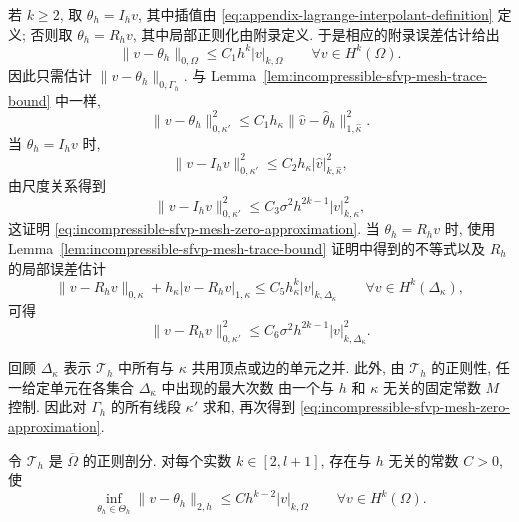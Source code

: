 \begin{Proof}
若 $k\geq2$, 取
$\theta_h=I_hv$, 其中插值由
\eqref{eq:appendix-lagrange-interpolant-definition} 定义;
否则取 $\theta_h=R_hv$, 其中局部正则化由附录定义.
于是相应的附录误差估计给出
\[
\|v-\theta_h\|_{0,\Omega}
\leq C_1h^k|v|_{k,\Omega}
\qquad\forall v\in H^k(\Omega).
\]
因此只需估计 $\|v-\theta_h\|_{0,\Gamma_h}$.
与 Lemma~\ref{lem:incompressible-sfvp-mesh-trace-bound} 中一样,
\[
\|v-\theta_h\|_{0,\kappa'}^2
\leq C_1h_\kappa
\|\widehat v-\widehat\theta_h\|_{1,\widehat\kappa}^2.
\]
当 $\theta_h=I_hv$ 时,
\[
\|v-I_hv\|_{0,\kappa'}^2
\leq C_2h_\kappa|\widehat v|_{k,\widehat\kappa}^2,
\]
由尺度关系得到
\[
\|v-I_hv\|_{0,\kappa'}^2
\leq C_3\sigma^2h^{2k-1}|v|_{k,\kappa}^2,
\]
这证明 \eqref{eq:incompressible-sfvp-mesh-zero-approximation}.
当 $\theta_h=R_hv$ 时, 使用
Lemma~\ref{lem:incompressible-sfvp-mesh-trace-bound}
证明中得到的不等式以及 $R_h$ 的局部误差估计
\begin{equation}\label{eq:incompressible-sfvp-local-regularization}
\|v-R_hv\|_{0,\kappa}
+h_\kappa|v-R_hv|_{1,\kappa}
\leq C_5h_\kappa^k|v|_{k,\Delta_\kappa}
\qquad\forall v\in H^k(\Delta_\kappa),
\end{equation}
可得
\[
\|v-R_hv\|_{0,\kappa'}^2
\leq C_6\sigma^2h^{2k-1}|v|_{k,\Delta_\kappa}^2.
\]

回顾 $\Delta_\kappa$ 表示 $\mathcal T_h$ 中所有与 $\kappa$
共用顶点或边的单元之并. 此外, 由 $\mathcal T_h$ 的正则性,
任一给定单元在各集合 $\Delta_\kappa$ 中出现的最大次数
由一个与 $h$ 和 $\kappa$ 无关的固定常数 $M$ 控制.
因此对 $\Gamma_h$ 的所有线段 $\kappa'$ 求和,
再次得到 \eqref{eq:incompressible-sfvp-mesh-zero-approximation}.
\end{Proof}

\begin{Lemma}\label{lem:incompressible-sfvp-mesh-two-approximation}
令 $\mathcal T_h$ 是 $\overline\Omega$ 的正则剖分.
对每个实数 $k\in[2,l+1]$, 存在与 $h$ 无关的常数 $C>0$, 使
\begin{equation}\label{eq:incompressible-sfvp-mesh-two-approximation}
\inf_{\theta_h\in\Theta_h}
\|v-\theta_h\|_{2,h}
\leq Ch^{k-2}|v|_{k,\Omega}
\qquad\forall v\in H^k(\Omega).
\end{equation}
\end{Lemma}


